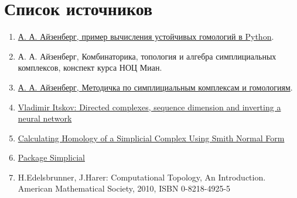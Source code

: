 \section{Список источников}

\begin{enumerate}
    \item  \href{https://github.com/AntonAyzenberg/Persistent-homology-Examples/blob/master/My_Persistence_test.ipynb}{А. А. Айзенберг, пример вычисления устойчивых гомологий в Python}.
    \item {А. А. Айзенберг, Комбинаторика, топология и алгебра симплициальных комплексов, конспект курса НОЦ Миан}.
    \item \href{https://vk.com/doc3973145_562177830?hash=a367bc57201051240d&dl=f3e20e16bcf57bdb73}{А. А. Айзенберг, Методичка по симплициальным комплексам и гомологиям}.
    \item \href{https://folk.ntnu.no/mariusth/Abel/Itskov.pdf} {Vladimir Itskov: Directed complexes, sequence dimension and inverting a neural network}
    \item \href{https://eric-bunch.github.io/blog/calculating_homology_of_simplicial_complex} {Calculating Homology of a Simplicial Complex Using Smith Normal Form}
    \item \href{https://github.com/nebneuron/Simplicial.jl} {Package Simplicial}
    \item {H.Edelsbrunner, J.Harer: Computational Topology, An Introduction. American Mathematical Society, 2010, ISBN 0-8218-4925-5}
\end{enumerate}